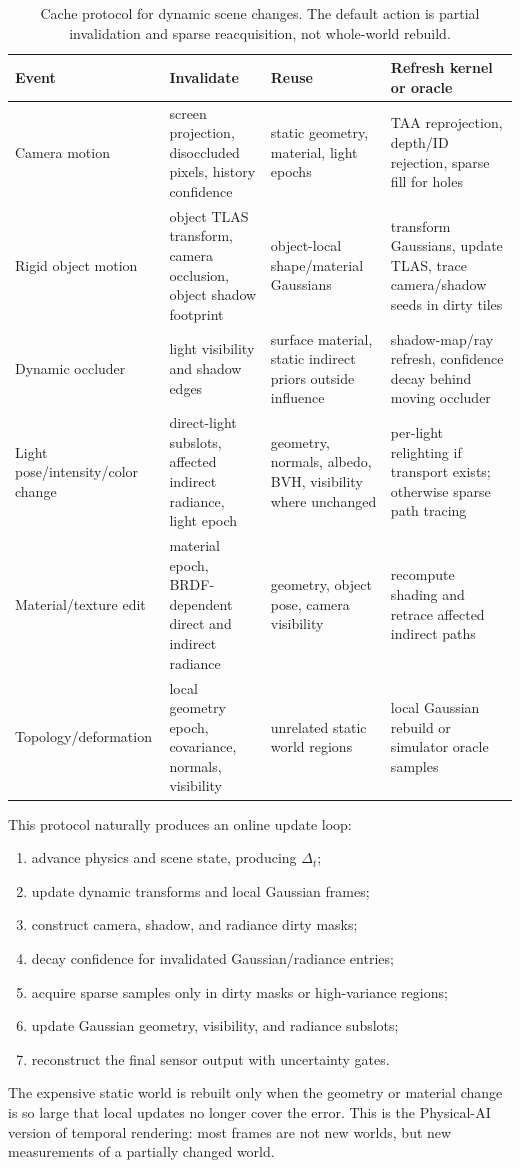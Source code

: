 \documentclass[10pt,journal,onecolumn]{IEEEtran}
\begin{document}
\begin{table}[t]
\centering
\footnotesize
\caption{Cache protocol for dynamic scene changes. The default action is
partial invalidation and sparse reacquisition, not whole-world rebuild.}
\label{tab:cache-invalidation-protocol}
\begin{tabular}{p{}p{}p{}p{}}
\toprule
\textbf{Event} & \textbf{Invalidate} & \textbf{Reuse} & \textbf{Refresh kernel or oracle} \\
\midrule
Camera motion & screen projection, disoccluded pixels, history confidence & static geometry, material, light epochs & TAA reprojection, depth/ID rejection, sparse fill for holes \\
Rigid object motion & object TLAS transform, camera occlusion, object shadow footprint & object-local shape/material Gaussians & transform Gaussians, update TLAS, trace camera/shadow seeds in dirty tiles \\
Dynamic occluder & light visibility and shadow edges & surface material, static indirect priors outside influence & shadow-map/ray refresh, confidence decay behind moving occluder \\
Light pose/intensity/color change & direct-light subslots, affected indirect radiance, light epoch & geometry, normals, albedo, BVH, visibility where unchanged & per-light relighting if transport exists; otherwise sparse path tracing \\
Material/texture edit & material epoch, BRDF-dependent direct and indirect radiance & geometry, object pose, camera visibility & recompute shading and retrace affected indirect paths \\
Topology/deformation & local geometry epoch, covariance, normals, visibility & unrelated static world regions & local Gaussian rebuild or simulator oracle samples \\
\bottomrule
\end{tabular}
\end{table}

This protocol naturally produces an online update loop:
\begin{enumerate}
  \item advance physics and scene state, producing $\Delta_t$;
  \item update dynamic transforms and local Gaussian frames;
  \item construct camera, shadow, and radiance dirty masks;
  \item decay confidence for invalidated Gaussian/radiance entries;
  \item acquire sparse samples only in dirty masks or high-variance regions;
  \item update Gaussian geometry, visibility, and radiance subslots;
  \item reconstruct the final sensor output with uncertainty gates.
\end{enumerate}
The expensive static world is rebuilt only when the geometry or material change
is so large that local updates no longer cover the error. This is the
Physical-AI version of temporal rendering: most frames are not new worlds, but
new measurements of a partially changed world.
\end{document}
